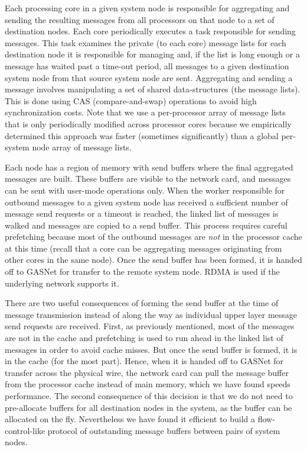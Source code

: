 Each processing core in a given system node is responsible for
aggregating and sending the resulting messages from all processors on
that node to a set of destination nodes.  Each core periodically
executes a task responsible for sending messages.  This task examines
the private (to each core) message lists for each destination node it
is responsible for managing and, if the list is long enough or a
message has waited past a time-out period, all messages to a given
destination system node from that source system node are sent.
Aggregating and sending a message involves manipulating a set of
shared data-structures (the message lists). This is done using CAS
(compare-and-swap) operations to avoid high synchronization costs.
Note that we use a per-processor array of message lists
that is only periodically modified across processor cores because we
empirically determined this approach was faster (sometimes
significantly) than a global per-system node array of message lists.

Each node has a region of memory with send buffers where the final aggregated
messages are built. These buffers are visible to the network card, and
messages can be sent with user-mode operations only. When the worker
responsible for outbound messages to a given system node has received a
sufficient number of message send requests or a timeout is reached, the
linked list of messages is walked and messages are copied to a send buffer.
This process requires careful prefetching because most of the outbound
messages are \emph{not\/} in the processor cache at this time (recall that a
core can be aggregating messages originating from other cores in the same
node). Once the send buffer has been formed, it is handed off to GASNet for
transfer to the remote system node. RDMA is used if the underlying network
supports it. 

There are two useful consequences of forming the send buffer at the time of
message transmission instead of along the way as individual upper layer
message send requests are received. First, as previously mentioned, most of the
messages are not in the cache and prefetching is used to run ahead in the
linked list of messages in order to avoid cache misses. But once the send
buffer is formed, it is in the cache (for the most part). Hence, when it is
handed off to GASNet for transfer across the physical wire, the network card
can pull the message buffer from the processor cache instead of main memory,
which we have found speeds performance. The second consequence of this
decision is that we do not need to pre-allocate buffers for all destination
nodes in the system, as the buffer can be allocated on the fly. Nevertheless
we have found it efficient to build a flow-control-like protocol of
outstanding message buffers between pairs of system nodes.

